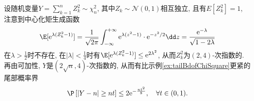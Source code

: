 \begin{example}
	设随机变量$Y = \sum_{k=1}^n Z_k^2  \sim \chi^2_n$,  其中$Z_k \sim \mathcal{N}(0,1)$相互独立, 且有$E[Z_k^2] = 1$, 注意到中心化矩生成函数
	\begin{equation*}
		\E[\mathrm{e}^{\lambda(Z_k^2 - 1)}]
		= \frac{1}{\sqrt{2 \pi}} \int_{-\infty}^{+\infty} \mathrm{e}^{\lambda(z^2-1)} \cdot \mathrm{e}^{-z^2/2} \dd z
		= \frac{\mathrm{e}^{-\lambda}}{\sqrt{1-2\lambda}}
	\end{equation*}
	在$\lambda > \frac{1}{2}$时不存在, 在$|\lambda| < \frac{1}{4}$时有$\E[\mathrm{e}^{\lambda(Z_k^2 - 1)}] \leq \mathrm{e}^{2 \lambda^2}$, 从而$Z_k^2$为$(2,4)$-次指数的. 
	再由可加性, $Y$是$(2 \sqrt{n}, 4)$-次指数的, 从而有比示例\ref{ex:tailBdofChiSquare}更紧的尾部概率界
	\begin{equation}\label{eq:tailOfChiSq}
		\P \left[ \left| Y - n \right| \geq n t \right]
		\leq 2 \mathrm{e}^{- \frac{n t^2}{8}},\quad \forall t \in (0,1). 
	\end{equation}
\end{example}

